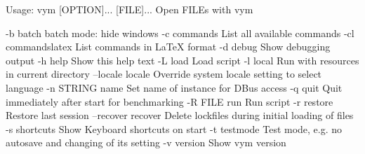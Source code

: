 Usage: vym [OPTION]... [FILE]...
Open FILEs with vym

-b           batch         batch mode: hide windows
-c           commands	    List all available commands
-cl          commandslatex List commands in LaTeX format
-d           debug         Show debugging output
-h           help          Show this help text
-L           load          Load script
-l           local         Run with resources in current directory
--locale     locale        Override system locale setting to select
                           language
-n  STRING   name          Set name of instance for DBus access
-q           quit          Quit immediately after start for benchmarking
-R  FILE     run           Run script
-r           restore       Restore last session
--recover    recover       Delete lockfiles during initial loading of
                           files
-s           shortcuts     Show Keyboard shortcuts on start
-t           testmode      Test mode, e.g. no autosave and changing of
                           its setting
-v           version       Show vym version

